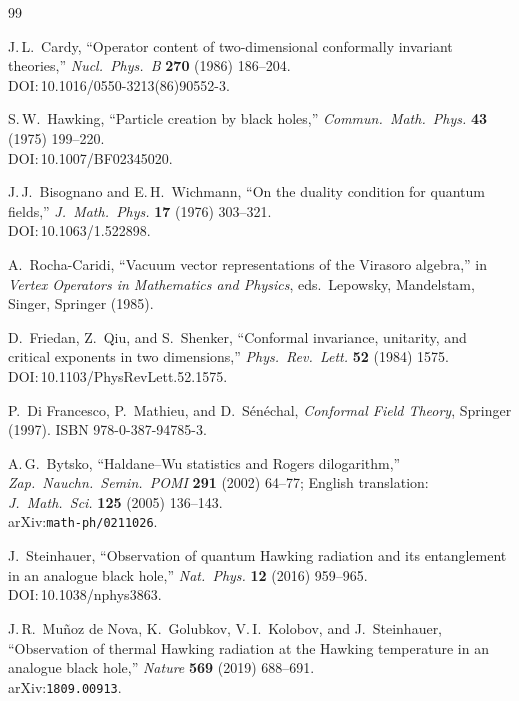 \documentclass[12pt]{article}
\begin{document}
\begin{thebibliography}{99}

J.\,L.\ Cardy,
``Operator content of two-dimensional conformally invariant theories,''
\textit{Nucl.\ Phys.\ B} \textbf{270} (1986) 186--204.\\
DOI:\,10.1016/0550-3213(86)90552-3.

S.\,W.\ Hawking,
``Particle creation by black holes,''
\textit{Commun.\ Math.\ Phys.} \textbf{43} (1975) 199--220.\\
DOI:\,10.1007/BF02345020.

J.\,J.\ Bisognano and E.\,H.\ Wichmann,
``On the duality condition for quantum fields,''
\textit{J.\ Math.\ Phys.} \textbf{17} (1976) 303--321.\\
DOI:\,10.1063/1.522898.

A.\ Rocha-Caridi,
``Vacuum vector representations of the Virasoro algebra,''
in \textit{Vertex Operators in Mathematics and Physics},
eds.\ Lepowsky, Mandelstam, Singer,
Springer (1985).

D.\ Friedan, Z.\ Qiu, and S.\ Shenker,
``Conformal invariance, unitarity, and critical exponents in two dimensions,''
\textit{Phys.\ Rev.\ Lett.} \textbf{52} (1984) 1575.\\
DOI:\,10.1103/PhysRevLett.52.1575.

P.\ Di Francesco, P.\ Mathieu, and D.\ S\'en\'echal,
\textit{Conformal Field Theory},
Springer (1997). ISBN 978-0-387-94785-3.

A.\,G.\ Bytsko,
``Haldane--Wu statistics and Rogers dilogarithm,''
\textit{Zap.\ Nauchn.\ Semin.\ POMI} \textbf{291} (2002) 64--77;
English translation: \textit{J.\ Math.\ Sci.} \textbf{125} (2005)
136--143.\\
arXiv:\texttt{math-ph/0211026}.

J.\ Steinhauer,
``Observation of quantum Hawking radiation and its entanglement
in an analogue black hole,''
\textit{Nat.\ Phys.} \textbf{12} (2016) 959--965.\\
DOI:\,10.1038/nphys3863.

J.\,R.\ Mu\~noz de Nova, K.\ Golubkov, V.\,I.\ Kolobov, and J.\ Steinhauer,
``Observation of thermal Hawking radiation at the Hawking temperature
in an analogue black hole,''
\textit{Nature} \textbf{569} (2019) 688--691.\\
arXiv:\texttt{1809.00913}.


\end{thebibliography}
\end{document}
